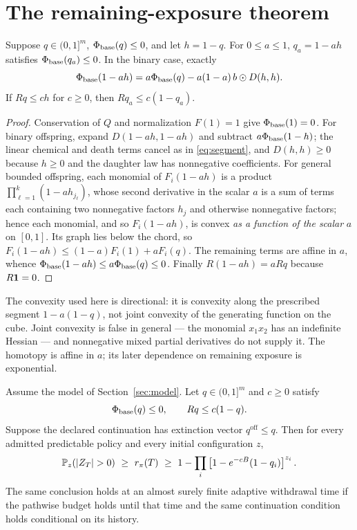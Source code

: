 \section{The remaining-exposure theorem}
\label{sec:exposure}

\begin{lemma}\label{lem:segment}
Suppose $q\in(0,1]^m$, $\Phi_{\mathrm{base}}(q)\le0$, and let $h=1-q$. For $0\le a\le1$,
$q_a=1-ah$ satisfies $\Phi_{\mathrm{base}}(q_a)\le0$. In the binary case, exactly
\begin{equation}\label{eq:segment}
 \Phi_{\mathrm{base}}(1-ah)=a\Phi_{\mathrm{base}}(q)-a(1-a)\,b\odot D(h,h).
\end{equation}
If $Rq\le ch$ for $c\ge0$, then $Rq_a\le c(1-q_a)$.
\end{lemma}

\begin{proof}
Conservation of $Q$ and normalization $F(1)=1$ give $\Phi_{\mathrm{base}}(1)=0$. For binary
offspring, expand $D(1-ah,1-ah)$ and subtract $a\Phi_{\mathrm{base}}(1-h)$; the linear chemical
and death terms cancel as in \eqref{eq:segment}, and $D(h,h)\ge0$ because
$h\ge0$ and the daughter law has nonnegative coefficients. For general bounded
offspring, each monomial of $F_i(1-ah)$ is a product
$\prod_{\ell=1}^k(1-ah_{j_\ell})$, whose second derivative in the scalar $a$ is
a sum of terms each containing two nonnegative factors $h_{j}$ and otherwise
nonnegative factors; hence each monomial, and so $F_i(1-ah)$, is convex
\emph{as a function of the scalar} $a$ on $[0,1]$. Its graph lies below the
chord, so $F_i(1-ah)\le(1-a)F_i(1)+aF_i(q)$. The remaining terms are affine in
$a$, whence $\Phi_{\mathrm{base}}(1-ah)\le a\Phi_{\mathrm{base}}(q)\le0$. Finally $R(1-ah)=aRq$ because
$R\mathbf1=0$.
\end{proof}

\begin{remark}
The convexity used here is directional: it is convexity along the prescribed
segment $1-a(1-q)$, not joint convexity of the generating function on the cube.
Joint convexity is false in general --- the monomial $x_1x_2$ has an indefinite
Hessian --- and nonnegative mixed partial derivatives do not supply it. The
homotopy is affine in $a$; its later dependence on remaining exposure is
exponential.
\end{remark}

\begin{theorem}\label{thm:main}
Assume the model of Section~\ref{sec:model}. Let $q\in(0,1]^m$ and $c\ge0$
satisfy
\begin{equation}\label{eq:cert}
 \Phi_{\mathrm{base}}(q)\le0,\qquad Rq\le c(1-q).
\end{equation}
Suppose the declared continuation has extinction vector $q^{\mathrm{off}}\le q$.
Then for every admitted predictable policy and every initial configuration $z$,
\begin{equation}\label{eq:main}
 \Prob_z(|Z_T|>0)\ \ge\ r_\pi(T)\ \ge\
 1-\prod_i\left[1-e^{-cB}(1-q_i)\right]^{z_i}.
\end{equation}
The same conclusion holds at an almost surely finite adaptive withdrawal time
if the pathwise budget holds until that time and the same continuation
condition holds conditional on its history.
\end{theorem}

